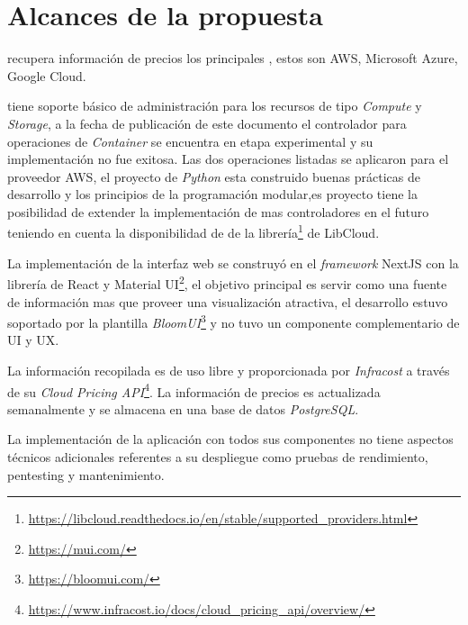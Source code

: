 \chapter{Alcances de la propuesta} %

\label{ch:alcances} %



\appName recupera información de precios los principales , estos son \acrshort{AWS}, \gls{Microsoft Azure}, \gls{Google Cloud}.\bigskip

\appName tiene soporte básico de administración para los recursos de tipo \emph{Compute} y \emph{Storage}, a la fecha de publicación de este documento el controlador para operaciones de \emph{Container} se encuentra en etapa experimental y su implementación no fue exitosa. Las dos operaciones listadas se aplicaron para el proveedor \acrshort{AWS}, el proyecto de \emph{Python} esta construido buenas prácticas de desarrollo y  los principios de la programación modular,es proyecto tiene la posibilidad de extender la implementación de mas controladores en el futuro teniendo en cuenta la disponibilidad de  de la librería\footnote{\url{https://libcloud.readthedocs.io/en/stable/supported_providers.html}} de \gls{LibCloud}. \bigskip

La implementación de la interfaz web se construyó en el \emph{framework} \gls{NextJS} con la librería de \gls{React} y \gls{Material UI}\footnote{\url{https://mui.com/}}, el objetivo principal es servir como una fuente de información mas que proveer una visualización atractiva, el desarrollo estuvo soportado por la plantilla \emph{BloomUI}\footnote{\url{https://bloomui.com/}} y no tuvo un componente complementario de \acrshort{UI} y \acrshort{UX}.\bigskip

La información recopilada es de uso libre y proporcionada por \emph{Infracost} a través de su \emph{Cloud Pricing API}\footnote{\url{https://www.infracost.io/docs/cloud_pricing_api/overview/}}. La información de precios es actualizada semanalmente y se almacena en una base de datos \emph{PostgreSQL}.\bigskip

La implementación de la aplicación con todos sus componentes no tiene aspectos técnicos adicionales referentes a su despliegue como pruebas de rendimiento, pentesting y mantenimiento.